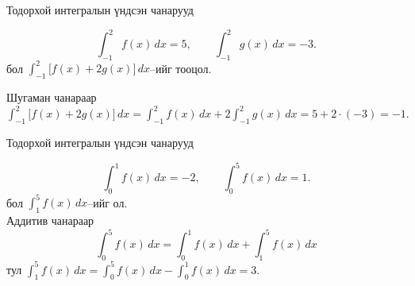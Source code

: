 \begin{frame}[allowframebreaks]{Тодорхой интегралын үндсэн чанарууд}
\begin{example} \[
\int_{-1}^{2} f(x)\,dx = 5, 
\qquad 
\int_{-1}^{2} g(x)\,dx = -3.
\] бол
  $\displaystyle\int_{-1}^{2}\bigl[f(x)+2g(x)\bigr]\,dx$–ийг тооцол.

Шугаман чанараар 
 $\displaystyle\int_{-1}^{2}\bigl[f(x)+2g(x)\bigr]\,dx=\displaystyle\int_{-1}^{2}f(x)\,dx+2\displaystyle\int_{-1}^{2}g(x)\,dx=5+2\cdot (-3)=-1.$
\end{example}
\end{frame}

\begin{frame}[allowframebreaks]{Тодорхой интегралын үндсэн чанарууд}
\begin{example}
\[
\int_{0}^{1} f(x)\,dx = -2,  
\qquad 
\int_{0}^{5} f(x)\,dx =1.
\] бол $\displaystyle\int_{1}^{5} f(x)\,dx$–ийг ол.\\
Аддитив чанараар $$\displaystyle\int_{0}^{5} f(x)\,dx=\displaystyle\int_{0}^{1} f(x)\,dx+\displaystyle\int_{1}^{5} f(x)\,dx$$ тул $\displaystyle\int_{1}^{5} f(x)\,dx=\displaystyle\int_{0}^{5} f(x)\,dx-\displaystyle\int_{0}^{1} f(x)\,dx=3.$

\end{example}
\end{frame}

